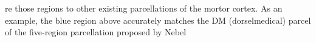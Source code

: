 \documentclass[fleqn]{article}
\begin{document}
re those regions to other existing parcellations of the mortor cortex. As an example, the blue region above accurately matches the DM (dorselmedical) parcel of the five-region parcellation proposed by Nebel 
\end{document}
